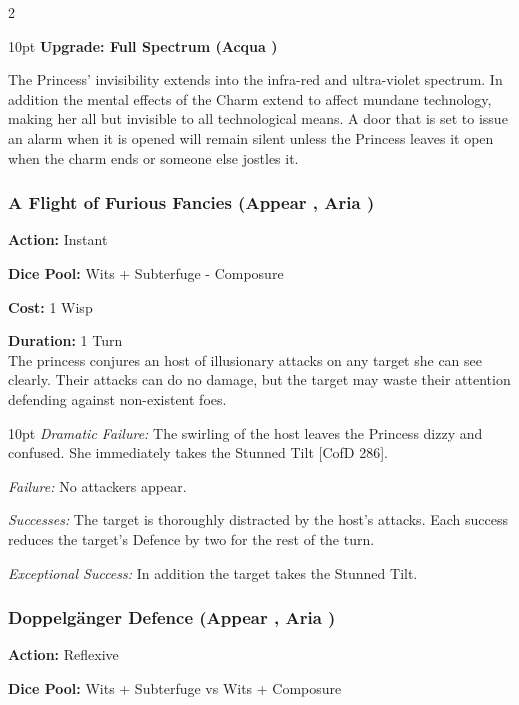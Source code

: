 \begin{multicols}{2}
\begin{myindentpar}{10pt}
\textbf{Upgrade: Full Spectrum (Acqua \textbullet\textbullet)}

The Princess' invisibility extends into the infra-red and ultra-violet spectrum. In addition the mental effects of the Charm extend to affect mundane technology, making her all but invisible to all technological means. A door that is set to issue an alarm when it is opened will remain silent unless the Princess leaves it open when the charm ends or someone else jostles it. 
\end{myindentpar}

\subsubsection*{A Flight of Furious Fancies (Appear \textbullet\textbullet\textbullet, Aria \textbullet\textbullet\textbullet)}

\noindent \textbf{Action:} Instant

\noindent \textbf{Dice Pool:} Wits + Subterfuge - Composure

\noindent \textbf{Cost:} 1 Wisp

\noindent \textbf{Duration:} 1 Turn\\

\noindent The princess conjures an host of illusionary attacks on any target she can see clearly. Their attacks can do no damage, but the target may waste their attention defending against non-existent foes.

\begin{myindentpar}{10pt}     \emph{Dramatic Failure:} The swirling of the host leaves the Princess dizzy and confused. She immediately takes the Stunned Tilt [CofD 286].

    \emph{Failure:} No attackers appear.

    \emph{Successes:}  The target is thoroughly distracted by the host’s attacks. Each success reduces the target's Defence by two for the rest of the turn.

    \emph{Exceptional Success:} In addition the target takes the Stunned Tilt. \end{myindentpar}


\subsubsection*{Doppelgänger Defence (Appear \textbullet\textbullet\textbullet, Aria \textbullet\textbullet\textbullet)}
\noindent \textbf{Action:} Reflexive

\noindent \textbf{Dice Pool:} Wits + Subterfuge vs Wits + Composure


\end{multicols}
